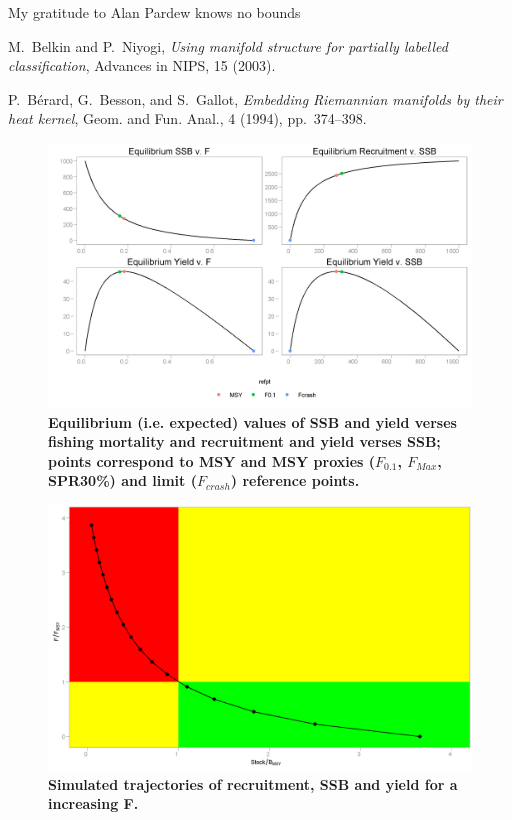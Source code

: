 \documentclass{pnastwo}
\begin{document}
\begin{article}
\begin{acknowledgments}
My gratitude to Alan Pardew knows no bounds
\end{acknowledgments}

\begin{thebibliography}{10}
M.~Belkin and P.~Niyogi, {\em Using manifold structure for partially
  labelled classification}, Advances in NIPS, 15 (2003).

P.~B\'erard, G.~Besson, and S.~Gallot, {\em Embedding {R}iemannian
  manifolds by their heat kernel}, Geom. and Fun. Anal., 4 (1994),
  pp.~374--398.
\end{thebibliography}
\end{article}

\begin{figure}[ht]
\begin{center}
\centerline{\includegraphics[width=.7\textwidth]{fig2.png}}
\end{center}
\caption{\bf{Equilibrium (i.e. expected) values of SSB and yield verses fishing mortality and recruitment and yield verses SSB; points correspond to
MSY and MSY proxies ($F_{0.1}$, $F_{Max}$, SPR30\%) and limit ($F_{crash}$) reference points.}}
\label{fig:brp}
\end{figure}

\begin{figure}[ht]
\begin{center}
\centerline{\includegraphics[width=.7\textwidth]{fig3.png}}
\end{center}
\caption{\bf{Simulated trajectories of recruitment, SSB and yield for a increasing F.}}
\label{fig:kobe}
\end{figure}
\end{document}
